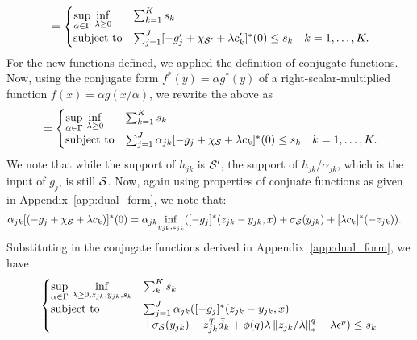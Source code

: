 \documentclass[12pt]{article}
\theoremstyle{thmstyleone}%
\theoremstyle{thmstyletwo}%
\theoremstyle{thmstylethree}%
\newcommand{\reviewChanges}{}
\begin{document}
\begin{appendices}
{\begin{equation*}
\begin{aligned}
&= \begin{cases}
	\underset{\alpha \in \Gamma}{\sup}~\underset{\lambda \geq 0}{\inf} &\sum_{k=1}^K s_k  \\
	\mbox{subject to}& \sum_{j=1}^J [-g_j' +\chi_{\mathcal{S}'} + \lambda c_k']^*(0) \le s_k \quad k = 1,\dots,K.
\end{cases}\\
\end{aligned}
\end{equation*}
For the new functions defined, we applied the definition of conjugate functions.}
\reviewChanges{
Now, using the conjugate form $f^*(y) = \alpha g^*(y)$ of a right-scalar-multiplied function $f(x) = \alpha g(x/\alpha)$, we rewrite the above as 
\begin{equation*}
	\begin{aligned}
&= \begin{cases}
	\underset{\alpha \in \Gamma}{\sup}~\underset{\lambda \geq 0}{\inf} &\sum_{k=1}^K s_k  \\
	\mbox{subject to}& \sum_{j=1}^J \alpha_{jk}[-g_j +\chi_{\mathcal{S}} + \lambda c_k]^*(0) \le s_k \quad k = 1,\dots,K.
\end{cases}\\
\end{aligned}
\end{equation*}
We note that while the support of $h_{jk}$ is $\mathcal{S}'$, the support of $h_{jk}/\alpha_{jk}$, which is the input of $g_j$, is still $\mathcal{S}$.  Now, again using properties of conjuate functions as given in Appendix~\ref{app:dual_form}, we note that:
\begin{equation*}
	\begin{aligned}
		\alpha_{jk}[(-g_j +\chi_{\mathcal{S}} + \lambda c_k)]^* (0) &= \alpha_{jk}\underset{y_{jk},z_{jk}}{\inf} ([-g_j]^*(z_{jk} - y_{jk},x) + \sigma_{\mathcal{S}}(y_{jk}) + [\lambda c_k]^* (-z_{jk})).
	\end{aligned}
\end{equation*}
Substituting in the conjugate functions derived in Appendix~\ref{app:dual_form}, we have 
\begin{equation*}
	\begin{aligned}
\begin{cases}
	\underset{\alpha \in \Gamma}{\sup}~\underset{\lambda \geq 0, z_{jk},y_{jk}, s_k}{\inf} & \sum_k^K s_k\\
	\mbox{subject to} & \sum_{j=1}^J \alpha_{jk}([-g_j]^*(z_{jk} - y_{jk},x)\\
	& + \sigma_{\mathcal{S}}(y_{jk}) - z_{jk}^T\bar{d}_k + \phi(q)\lambda \left\|z_{jk}/\lambda \right\|^q_* + \lambda \epsilon^p ) \le s_k \\

\end{cases}
\end{aligned}
\end{equation*}}
\end{appendices}
\end{document}
